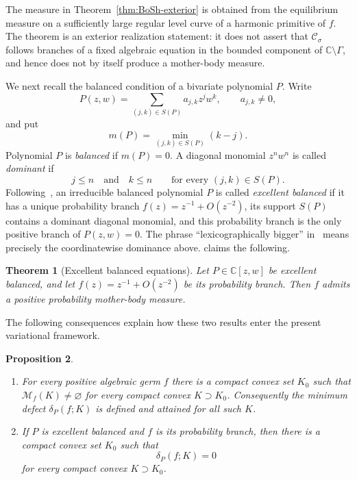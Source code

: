 \documentclass[10pt,a4paper]{amsart}
\newtheorem{theorem}{Theorem}[section]
\newtheorem{proposition}[theorem]{Proposition}
\newcommand{\bC}{\mathbb C}
\newcommand{\M}{\mathcal M}
\newcommand{\Cauchy}{\mathcal C}
\begin{document}
The measure in Theorem~\ref{thm:BoSh-exterior} is obtained from the equilibrium
measure on a sufficiently large regular level curve of a harmonic primitive of
$f$.  The theorem is an exterior realization statement: it does not assert that
$\Cauchy_\sigma$ follows branches of a fixed algebraic equation in the bounded
component of $\bC\setminus\Gamma$, and hence does not by itself produce a
mother-body measure.

\medskip
We next recall the balanced condition of a bivariate polynomial $P$.  Write
\[
 P(z,w)=\sum_{(j,k)\in S(P)}a_{j,k}z^jw^k,
 \qquad a_{j,k}\ne0,
\]
and put
\[
 m(P)=\min_{(j,k)\in S(P)}(k-j).
\]
Polynomial $P$ is \emph{balanced} if $m(P)=0$.  A diagonal monomial $z^nw^n$
is called \emph{dominant} if
\[
 j\le n\quad\text{and}\quad k\le n
 \qquad\text{for every }(j,k)\in S(P).
\]
Following~\cite{BoSh}, an irreducible balanced polynomial $P$ is called
\emph{excellent balanced} if it has a unique probability branch
$f(z)=z^{-1}+O(z^{-2})$, its support $S(P)$ contains a dominant diagonal
monomial, and this probability branch is the only positive branch of $P(z,w)=0$.
The phrase ``lexicographically bigger'' in~\cite{BoSh} means precisely the
coordinatewise dominance above. \cite[Theorem~5]{BoSh} claims the following. 

\begin{theorem}[Excellent balanced equations] 
\label{thm:BoSh-excellent}
Let $P\in\bC[z,w]$ be excellent balanced, and let
$f(z)=z^{-1}+O(z^{-2})$ be its probability branch.  Then $f$ admits a positive
probability mother-body measure.
\end{theorem}

  The following consequences explain how these two
results enter the present variational framework.

\begin{proposition}\label{prop:BoSh-defect-connection}
\begin{enumerate}[label=\textup{(\roman*)}]
\item For every positive algebraic germ $f$ there is a compact convex set $K_0$
such that $\M_f(K)\ne\varnothing$ for every compact convex $K\supset K_0$.
Consequently the minimum defect $\delta_P(f;K)$ is defined and attained for all
such $K$.
\item If $P$ is excellent balanced and $f$ is its probability branch, then there
is a compact convex set $K_0$ such that
\[
 \delta_P(f;K)=0
\]
for every compact convex $K\supset K_0$.
\end{enumerate}
\end{proposition}
\end{document}
